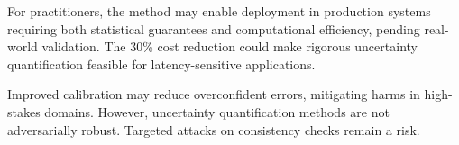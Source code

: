 For practitioners, the method may enable deployment in production systems requiring both statistical guarantees and computational efficiency, pending real-world validation. The 30\% cost reduction could make rigorous uncertainty quantification feasible for latency-sensitive applications.

Improved calibration may reduce overconfident errors, mitigating harms in high-stakes domains. However, uncertainty quantification methods are not adversarially robust. Targeted attacks on consistency checks remain a risk.
